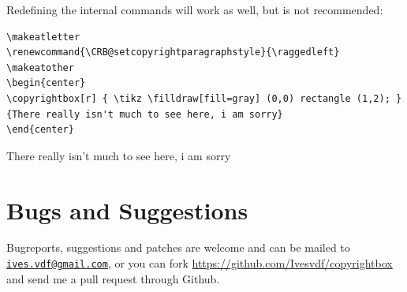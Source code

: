 \documentclass[pagesize=auto]{scrartcl}
\newcommand*{\mail}[1]{\href{mailto:#1}{\texttt{#1}}}
\begin{document}
Redefining the internal commands will work as well, but is not
recommended:
\begin{verbatim}
\makeatletter
\renewcommand{\CRB@setcopyrightparagraphstyle}{\raggedleft}
\makeatother
\begin{center}
\copyrightbox[r] { \tikz \filldraw[fill=gray] (0,0) rectangle (1,2); }
{There really isn't much to see here, i am sorry}
\end{center}
\end{verbatim}
\makeatletter
\renewcommand{\CRB@setcopyrightparagraphstyle}{\raggedleft}
\makeatother
\begin{center}
{There really isn't much to see here, i am sorry}
\end{center}

\section{Bugs and Suggestions}
Bugreports, suggestions and patches are welcome and can be mailed to
\mail{ives.vdf@gmail.com}, or you can fork
\url{https://github.com/Ivesvdf/copyrightbox} and send me a pull request
through Github. 
\end{document}
